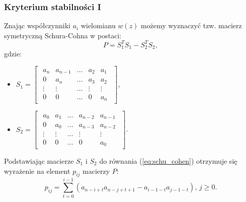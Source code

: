 \documentclass{article}
\begin{document}
        \subsubsection{Kryterium stabilności I}
        Znając współczynniki $a_{i}$ wielomianu $w(z)$ możemy wyznaczyć tzw. macierz symetryczną Schura-Cohna w postaci:
        \begin{equation}
            \label{eq:schu_cohen}
            P = S_{1}^{T}S_{1} - S_{2}^{T}S_{2},
        \end{equation}
        gdzie:
        \begin{itemize}
            \item $
                S_{1}
                =
                \begin{bmatrix}
                \begin{array}{ccccc}
                    a_{n}   &   a_{n-1}     &   \dots   &   a_{2}       &   a_{1}\\
                    0       &   a_{n}       &   \dots   &   a_{3}       &   a_{2}\\
                    \vdots  &   \vdots      &   \dots   &   \vdots      &   \vdots\\
                    0       &   0           &   \dots   &   0           &   a_{n}
                \end{array}
                \end{bmatrix}
            $,

            \item $
                S_{2}
                =
                \begin{bmatrix}
                \begin{array}{ccccc}
                    a_{0}   &   a_{1}   &   \dots   &   a_{n-2} &   a_{n-1}\\
                    0       &   a_{0}   &   \dots   &   a_{n-3} &   a_{n-2}\\
                    \vdots  &   \vdots  &   \dots   &   \vdots  &   \vdots\\
                    0       &   0       &   \dots   &   0       &   a_{0}
                \end{array}
                \end{bmatrix}
            $.
        \end{itemize}
        Podstawiając macierze $S_{1}$ i $S_{2}$ do równania (\ref{eq:schu_cohen}) otrzymuje się wyrażenie na element $p_{ij}$ macierzy $P$:
        \begin{equation}
            \label{eq:schu_cohen_pij}
            p_{ij} = \sum_{t=0}^{i-1}{
            \left( a_{n-i+t}a_{n-j+t+1} - a_{i-1-t}a_{j-1-t} \right)
            },\,j\geq0.
        \end{equation}
\end{document}

